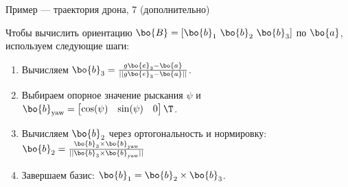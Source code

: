 \begin{frame}{Пример — траектория дрона, 7 (дополнительно)}
	\begin{flushleft}
		
		
		Чтобы вычислить ориентацию $\bo{B} = [\bo{b}_1 \ \bo{b}_2 \ \bo{b}_3]$ по $\bo{a}$, используем следующие шаги:
		
		\begin{enumerate}
			
			\item Вычисляем $\bo{b}_3 =  \frac{g \bo{e}_3 - \bo{a}}{||g \bo{e}_3 - \bo{a}||}$.
			
			\item Выбираем опорное значение рыскания $\psi$ и $\bo{b}_\text{yaw} = \begin{bmatrix}
				\cos (\psi) & \sin(\psi) & 0
			\end{bmatrix}\T$.
			
			\item Вычисляем $\bo{b}_2$ через ортогональность и нормировку: $\bo{b}_2 = \frac{\bo{b}_3 \times \bo{b}_\text{yaw}}{||\bo{b}_3 \times \bo{b}_\text{yaw}||}$
			
			\item Завершаем базис: $\bo{b}_1 =  \bo{b}_2 \times \bo{b}_3$.
		\end{enumerate}
		
	\end{flushleft}
\end{frame}



